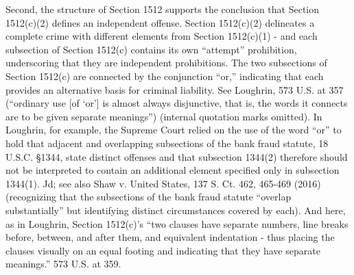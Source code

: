 Second, the structure of Section 1512 supports the conclusion that Section 1512(c)(2) defines an independent offense.
Section 1512(c)(2) delineates a complete crime with different elements from Section 1512(c)(1) - and each subsection of Section 1512(c) contains its own “attempt” prohibition, underscoring that they are independent prohibitions.
The two subsections of Section 1512(c) are connected by the conjunction “or,” indicating that each provides an alternative basis for criminal liability.
See Loughrin, 573 U.S. at 357 (“ordinary use [of ‘or’] is almost always disjunctive, that is, the words it connects are to be given separate meanings”) (internal quotation marks omitted).
In Loughrin, for example, the Supreme Court relied on the use of the word “or” to hold that adjacent and overlapping subsections of the bank fraud statute, 18 U.S.C. \S 1344, state distinct offenses and that subsection 1344(2) therefore should not be interpreted to contain an additional element specified only in subsection 1344(1). Jd;
see also Shaw v. United States, 137 S. Ct. 462, 465-469 (2016) (recognizing that the subsections of the bank fraud statute “overlap substantially” but identifying distinct circumstances covered by each).%
And here, as in Loughrin, Section 1512(c)’s “two clauses have separate numbers, line breaks before, between, and after them, and equivalent indentation - thus placing the clauses visually on an equal footing and indicating that they have separate meanings.” 573 U.S. at 359.

